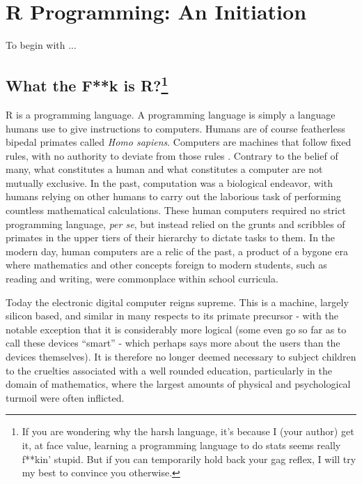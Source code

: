 \chapter{R Programming: An Initiation}

To begin with ...

\section[What the F**k is R?]{What the F**k is R?\footnote{If you are wondering why the harsh language, it's because I (your author) get it, at face value, learning a programming language to do stats seems really f**kin' stupid. But if you can temporarily hold back your gag reflex, I will try my best to convince you otherwise.}}

\lettrine{R}{ } is a \gls{programming language}. A programming language is simply a language humans use to give instructions to computers. Humans are of course featherless bipedal primates called \textit{Homo sapiens}. Computers are machines that follow fixed rules, with no authority to deviate from those rules \parencite{Turing1950}. Contrary to the belief of many, what constitutes a human and what constitutes a computer are not mutually exclusive. In the past, computation was a biological endeavor, with humans relying on other humans to carry out the laborious task of performing countless mathematical calculations. These human computers required no strict programming language, \textit{per se}, but instead relied on the grunts and scribbles of primates in the upper tiers of their hierarchy to dictate tasks to them.  In the modern day, human computers are a relic of the past, a product of a bygone era where mathematics and other concepts foreign to modern students, such as reading and writing, were commonplace within school curricula. 

Today the electronic digital computer reigns supreme.  This is a machine, largely silicon based, and similar in many respects to its primate precursor - with the notable exception that it is considerably more logical (some even go so far as to call these devices ``smart'' - which perhaps says more about the users than the devices themselves). It is therefore no longer deemed necessary to subject children to the cruelties associated with a well rounded education, particularly in the domain of mathematics, where the largest amounts of physical and psychological turmoil were often inflicted.

